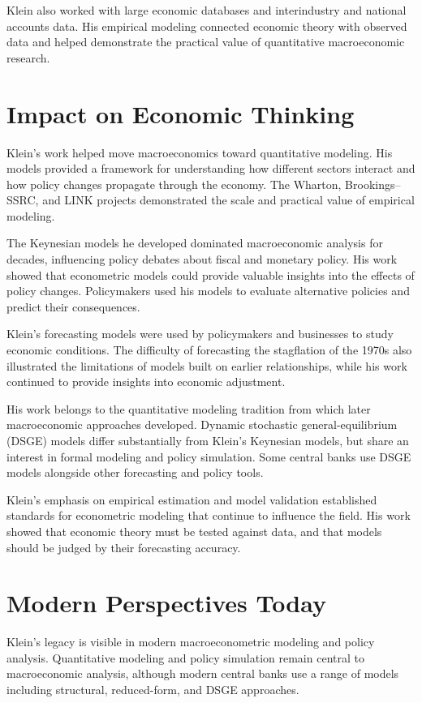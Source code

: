 Klein also worked with large economic databases and interindustry and national
accounts data. His empirical modeling connected economic theory with observed
data and helped demonstrate the practical value of quantitative macroeconomic
research.

\section{Impact on Economic Thinking}
Klein's work helped move macroeconomics toward quantitative modeling. His models
provided a framework for understanding how different sectors interact and how
policy changes propagate through the economy. The Wharton, Brookings--SSRC, and
LINK projects demonstrated the scale and practical value of empirical modeling.

The Keynesian models he developed dominated macroeconomic analysis for decades,
influencing policy debates about fiscal and monetary policy. His work showed
that econometric models could provide valuable insights into the effects of
policy changes. Policymakers used his models to evaluate alternative policies
and predict their consequences.

Klein's forecasting models were used by policymakers and businesses to study
economic conditions. The difficulty of forecasting the stagflation of the 1970s
also illustrated the limitations of models built on earlier relationships, while
his work continued to provide insights into economic adjustment.

His work belongs to the quantitative modeling tradition from which later
macroeconomic approaches developed. Dynamic stochastic general-equilibrium
(DSGE) models differ substantially from Klein's Keynesian models, but share an
interest in formal modeling and policy simulation. Some central banks use DSGE
models alongside other forecasting and policy tools.

Klein's emphasis on empirical estimation and model validation established
standards for econometric modeling that continue to influence the field. His
work showed that economic theory must be tested against data, and that models
should be judged by their forecasting accuracy.

\section{Modern Perspectives Today}
Klein's legacy is visible in modern macroeconometric modeling and policy
analysis. Quantitative modeling and policy simulation remain central to
macroeconomic analysis, although modern central banks use a range of models
including structural, reduced-form, and DSGE approaches.

